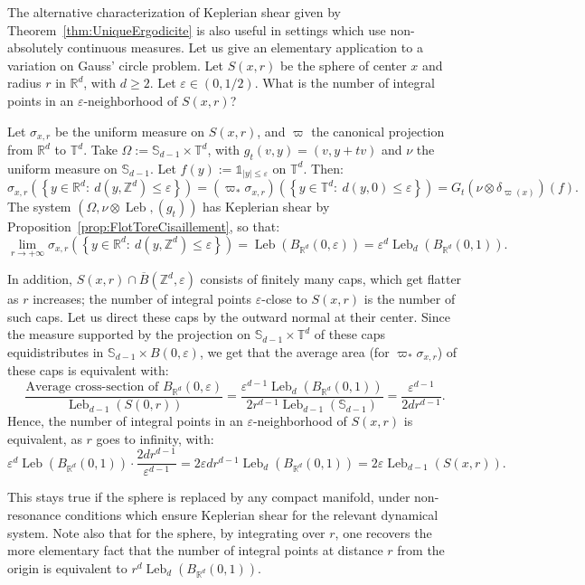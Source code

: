 \documentclass[10pt]{amsart}
\theoremstyle{definition}\newtheorem{defi}[theo]{Definition}\newtheorem{rema}[theo]{Remark}\newtheorem{exam}[theo]{Example}\newtheorem{exem}[theo]{Example}\newtheorem{nota}[theo]{Notation}
\DeclareMathOperator{\Leb}{Leb}
\newcommand{\Z}{\mathbb{Z}}
\newcommand{\R}{\mathbb{R}}
\newcommand{\Sbb}{\mathbb{S}}
\newcommand{\Tbb}{\mathbb{T}}
\newcommand*{\un}{\mathds{1}}
\begin{document}
The alternative characterization of Keplerian shear given by Theorem~\ref{thm:UniqueErgodicite} is also useful in settings which use non-absolutely continuous measures. Let us give an elementary application to a variation on Gauss' circle problem. Let $S(x,r)$ be the sphere of center $x$ and radius $r$ in $\R^d$, with $d \geq 2$. Let $\varepsilon \in (0, 1/2)$. What is the number of integral points in an $\varepsilon$-neighborhood of $S(x,r)$?


Let $\sigma_{x,r}$ be the uniform measure on $S (x,r)$, and $\varpi$ the canonical projection from $\R^d$ to $\Tbb^d$. Take $\Omega := \Sbb_{d-1} \times \Tbb^d$, with $g_t (v,y) = (v,y+tv)$ and $\nu$ the uniform measure on $\Sbb_{d-1}$. Let $f(y) := \un_{|y| \leq \varepsilon}$ on $\Tbb^d$. Then:
\[
\sigma_{x,r} \left(\!\left\{y \in \R^d: \ d(y,\Z^d) \leq \varepsilon\right\}\!\right)\!=\!(\varpi_*\sigma_{x,r}) \left(\left\{y\in \Tbb^d: \ d(y,0) \leq \varepsilon\right\}\right)\!=\!G_t (\nu \otimes \delta_{\varpi (x)}) (f).
\]
The system $(\Omega, \nu \otimes \Leb, (g_t))$ has Keplerian shear by Proposition~\ref{prop:FlotToreCisaillement}, so that:
\[
\lim_{r \to + \infty} \sigma_{x,r} \left(\left\{y \in \R^d: \ d(y,\Z^d) \leq \varepsilon\right\}\right) = \Leb (B_{\R^d} (0, \varepsilon)) = \varepsilon^d \Leb_d (B_{\R^d} (0, 1)).
\]

In addition, $S(x,r) \cap\overline{B}(\Z^d, \varepsilon)$ consists of finitely many caps, which get flatter as $r$ increases; the number of integral points $\varepsilon$-close to $S(x,r)$ is the number of such caps. Let us direct these caps by the outward normal at their center. Since the measure supported by the projection on $\Sbb_{d-1} \times \Tbb^d$ of these caps equidistributes in $\Sbb_{d-1} \times B(0,\varepsilon)$, we get that the average area (for $\varpi_* \sigma_{x,r}$) of these caps is equivalent with:
\[
\frac{\text{Average cross-section of } B_{\R^d}(0,\varepsilon)}{\Leb_{d-1} (S(0,r))} = \frac{\varepsilon^{d-1} \Leb_d (B_{\R^d}(0,1))}{2 r^{d-1} \Leb_{d-1} (\Sbb_{d-1})} = \frac{\varepsilon^{d-1}}{2 d r^{d-1}}.
\]
Hence, the number of integral points in an $\varepsilon$-neighborhood of $S(x,r)$ is equivalent, as $r$ goes to infinity, with:
\[
\varepsilon^d \Leb (B_{\R^d} (0, 1)) \cdot \frac{2 d r^{d-1}}{\varepsilon^{d-1}} = 2 \varepsilon d r^{d-1} \Leb_d (B_{\R^d} (0, 1)) = 2 \varepsilon \Leb_{d-1} (S (x, r)).
\]

This stays true if the sphere is replaced by any compact manifold, under non-resonance conditions which ensure Keplerian shear for the relevant dynamical system. Note also that for the sphere, by integrating over $r$, one recovers the more elementary fact that the number of integral points at distance $r$ from the origin is equivalent to $r^d \Leb_d (B_{\R^d}(0,1))$.
\end{document}
